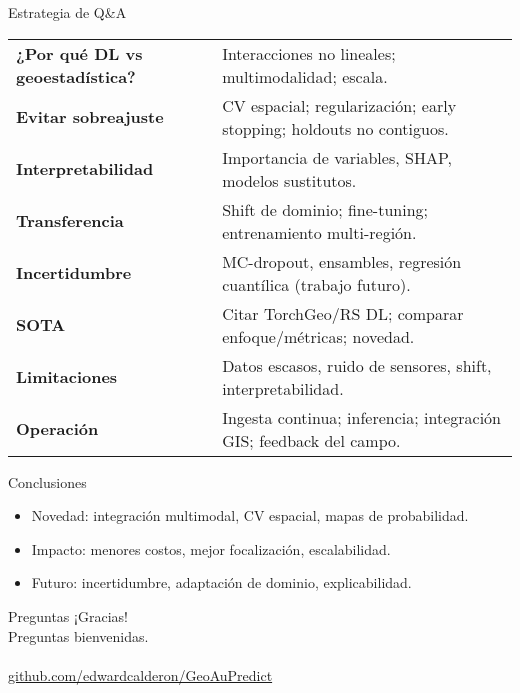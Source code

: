 \documentclass[aspectratio=169]{beamer}
\begin{document}
\begin{frame}{Estrategia de Q\&A}
  \small
  \begin{tabular}{p{} p{}}
  \textbf{¿Por qué DL vs geoestadística?} & Interacciones no lineales; multimodalidad; escala. \\
  \textbf{Evitar sobreajuste} & CV espacial; regularización; early stopping; holdouts no contiguos. \\
  \textbf{Interpretabilidad} & Importancia de variables, SHAP, modelos sustitutos. \\
  \textbf{Transferencia} & Shift de dominio; fine-tuning; entrenamiento multi-región. \\
  \textbf{Incertidumbre} & MC-dropout, ensambles, regresión cuantílica (trabajo futuro). \\
  \textbf{SOTA} & Citar TorchGeo/RS DL; comparar enfoque/métricas; novedad. \\
  \textbf{Limitaciones} & Datos escasos, ruido de sensores, shift, interpretabilidad. \\
  \textbf{Operación} & Ingesta continua; inferencia; integración GIS; feedback del campo. \\
  \end{tabular}
\end{frame}

\begin{frame}{Conclusiones}
  \begin{itemize}
    \item Novedad: integración multimodal, CV espacial, mapas de probabilidad.
    \item Impacto: menores costos, mejor focalización, escalabilidad.
    \item Futuro: incertidumbre, adaptación de dominio, explicabilidad.
  \end{itemize}
\end{frame}

\begin{frame}{Preguntas}
  \centering\Large ¡Gracias!\\[0.5cm]Preguntas bienvenidas.\\[0.6cm]
  \href{https://edwardcalderon.github.io/GeoAuPredict/login}{}\\[0.4cm]
  \small \href{https://github.com/edwardcalderon/GeoAuPredict/}{github.com/edwardcalderon/GeoAuPredict}
\end{frame}
\end{document}
